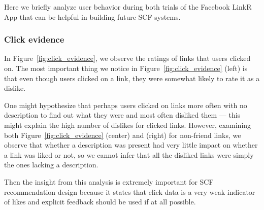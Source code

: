 \label{sec:behavior}

Here we briefly analyze user behavior during both trials of the Facebook
LinkR App that can be helpful in building future SCF systems.

\subsubsection{Click evidence}

In Figure~\ref{fig:click_evidence}, we observe the ratings of links
that users clicked on.  The most important thing we notice in 
Figure~\ref{fig:click_evidence} (left) is that even though users
clicked on a link, they were somewhat likely to rate it as a dislike.

One might hypothesize that perhaps users clicked on links more often with
no description to find out what they were and most often disliked them ---
this might explain the high number of dislikes for clicked links.  However,
examining both 
Figure~\ref{fig:click_evidence} (center) and (right)
for non-friend links, we observe that whether a description was present
had very little impact on whether a link was liked or not, so we cannot
infer that all the disliked links were simply the ones lacking a description.

Then the insight from this analysis is extremely important 
for SCF recommendation design because it states that click data is a very
weak indicator of likes and explicit feedback should be used if at all
possible.


